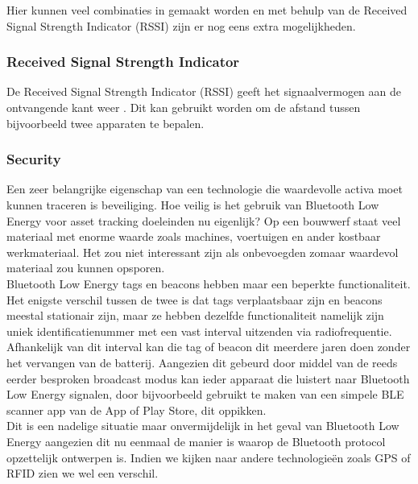 Hier kunnen veel combinaties in gemaakt worden en met behulp van de Received Signal Strength Indicator (RSSI) zijn er nog eens extra mogelijkheden.


\subsubsection{Received Signal Strength Indicator}

De Received Signal Strength Indicator (RSSI) geeft het signaalvermogen aan de ontvangende kant weer \autocite{Jais2015} . Dit kan gebruikt worden om de afstand tussen bijvoorbeeld twee apparaten te bepalen.


\subsubsection{Security}
Een zeer belangrijke eigenschap van een technologie die waardevolle activa moet kunnen traceren is beveiliging. Hoe veilig is het gebruik van Bluetooth Low Energy voor asset tracking doeleinden nu eigenlijk? Op een bouwwerf staat veel materiaal met enorme waarde zoals machines, voertuigen en ander kostbaar werkmateriaal. Het zou niet interessant zijn als onbevoegden zomaar waardevol materiaal zou kunnen opsporen.\\

Bluetooth Low Energy tags en beacons hebben maar een beperkte functionaliteit. Het enigste verschil tussen de twee is dat tags verplaatsbaar zijn en beacons meestal stationair zijn, maar ze hebben dezelfde functionaliteit namelijk zijn uniek identificatienummer met een vast interval uitzenden via radiofrequentie. Afhankelijk van dit interval kan die tag of beacon dit meerdere jaren doen zonder het vervangen van de batterij. Aangezien dit gebeurd door middel van de reeds eerder besproken broadcast modus \autocite{Sevier2019} kan ieder apparaat die luistert naar Bluetooth Low Energy signalen, door bijvoorbeeld gebruikt te maken van een simpele BLE scanner app van de App of Play Store, dit oppikken. \\

Dit is een nadelige situatie maar onvermijdelijk in het geval van Bluetooth Low Energy aangezien dit nu eenmaal de manier is waarop de Bluetooth protocol opzettelijk ontwerpen is. Indien we kijken naar andere technologieën zoals GPS of RFID zien we wel een verschil.\\

